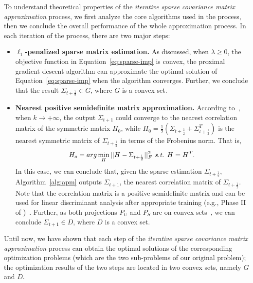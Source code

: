 To understand theoretical properties of the \emph{iterative sparse covariance matrix approximation} process, we first analyze the core algorithms used in the process, then we conclude the overall performance of the whole approximation process. 
In each iteration of the process, there are two major steps:
\begin{itemize}
\item \textbf{$\ell_1$-penalized sparse matrix estimation. } As discussed, when $\lambda\geq 0$, the objective function in Equation~\ref{eq:sparse-imp} is convex, the proximal gradient descent algorithm can approximate the optimal solution of Equation~\ref{eq:sparse-imp} when the algorithm converges. 
Further, we conclude that the result $\Sigma_{t+\frac{1}{2}}\in G$, where $G$ is a convex set.

\item \textbf{Nearest positive semidefinite matrix approximation. } According to~\cite{higham2002computing}, when $k\to+\infty$, the output $\Sigma_{t+1}$ could converge to the nearest correlation matrix of the symmetric matrix $H_0$, while $H_0=\frac{1}{2}(\Sigma_{t+\frac{1}{2}}+\Sigma_{t+\frac{1}{2}}^T)$ is the nearest symmetric matrix of $\Sigma_{t+\frac{1}{2}}$ in terms of the Frobenius norm.
That is, 
$$H_o=arg\min_{H} ||H-\Sigma_{t+\frac{1}{2}}||_F^2\emph{ s.t. }H=H^T.$$ 
In this case, we can conclude that, given the sparse estimation $\Sigma_{t+\frac{1}{2}}$, Algorithm~\ref{alg:apm} outputs $\Sigma_{t+1}$, the nearest correlation matrix of $\Sigma_{t+\frac{1}{2}}$. 
Note that the correlation matrix is a positive semidefinite matrix and can be used for linear discriminant analysis after appropriate training (e.g., Phase II of \TheName{})~\cite{tabachnick2001using}.
Further, as both projections $P_U$ and $P_S$ are on convex sets~\cite{higham2002computing}, we can conclude $\Sigma_{t+1}\in D$, where $D$ is a convex set.

\end{itemize}
%
%
%
Until now, we have shown that each step of the \emph{iterative sparse covariance matrix approximation} process can obtain the optimal solutions of the corresponding optimization problems (which are the two sub-problems of our original problem); the optimization results of the two steps are located in two convex sets, namely $G$ and $D$. 

